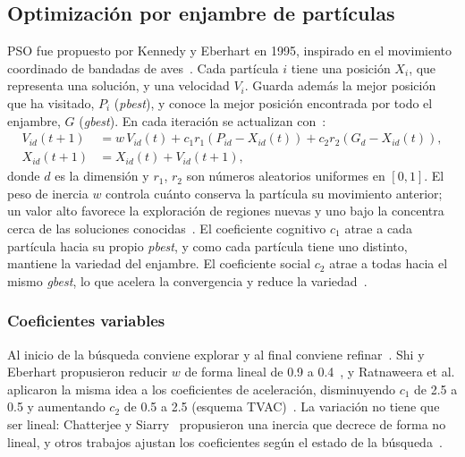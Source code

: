 \subsection{Optimización por enjambre de partículas}
\label{sec:pso}

PSO fue propuesto por Kennedy y Eberhart en 1995, inspirado en el movimiento coordinado de bandadas de aves~\cite{kennedy1995pso}. Cada partícula $i$ tiene una posición $X_i$, que representa una solución, y una velocidad $V_i$. Guarda además la mejor posición que ha visitado, $P_i$ (\textit{pbest}), y conoce la mejor posición encontrada por todo el enjambre, $G$ (\textit{gbest}). En cada iteración se actualizan con~\cite{shi1998modified}:
\begin{align}
V_{id}(t+1) &= w\,V_{id}(t) + c_1 r_1 \left(P_{id} - X_{id}(t)\right) + c_2 r_2 \left(G_d - X_{id}(t)\right), \label{eq:velocidad}\\
X_{id}(t+1) &= X_{id}(t) + V_{id}(t+1), \label{eq:posicion}
\end{align}
donde $d$ es la dimensión y $r_1$, $r_2$ son números aleatorios uniformes en $[0,1]$. El peso de inercia $w$ controla cuánto conserva la partícula su movimiento anterior; un valor alto favorece la exploración de regiones nuevas y uno bajo la concentra cerca de las soluciones conocidas~\cite{shi1998parameter}. El coeficiente cognitivo $c_1$ atrae a cada partícula hacia su propio \textit{pbest}, y como cada partícula tiene uno distinto, mantiene la variedad del enjambre. El coeficiente social $c_2$ atrae a todas hacia el mismo \textit{gbest}, lo que acelera la convergencia y reduce la variedad~\cite{ratnaweera2004self}.

\subsubsection{Coeficientes variables}

Al inicio de la búsqueda conviene explorar y al final conviene refinar~\cite{crepinsek2013exploration}. Shi y Eberhart propusieron reducir $w$ de forma lineal de 0.9 a 0.4~\cite{shi1999empirical}, y Ratnaweera et al. aplicaron la misma idea a los coeficientes de aceleración, disminuyendo $c_1$ de 2.5 a 0.5 y aumentando $c_2$ de 0.5 a 2.5 (esquema TVAC)~\cite{ratnaweera2004self}. La variación no tiene que ser lineal: Chatterjee y Siarry~\cite{chatterjee2006nonlinear} propusieron una inercia que decrece de forma no lineal, y otros trabajos ajustan los coeficientes según el estado de la búsqueda~\cite{zhan2009adaptive, nickabadi2011novel}.

